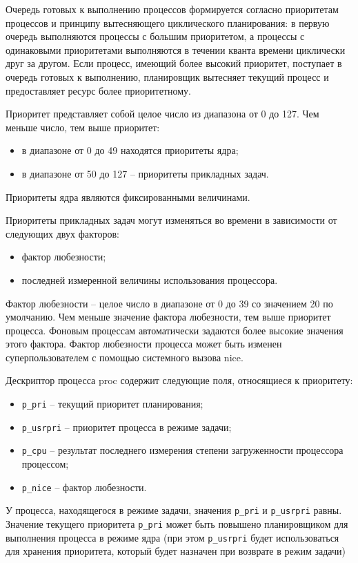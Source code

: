 Очередь готовых к выполнению процессов формируется согласно приоритетам процессов и принципу вытесняющего циклического планирования: в первую очередь выполняются процессы с большим приоритетом, а процессы с одинаковыми приоритетами выполняются в течении кванта времени циклически друг за другом. Если процесс, имеющий более высокий приоритет, поступает в очередь готовых к выполнению, планировщик вытесняет текущий процесс и предоставляет ресурс более приоритетному.

Приоритет представляет собой целое число из диапазона от 0 до 127. Чем меньше число, тем выше приоритет:
\begin{itemize}
    \item в диапазоне от 0 до 49 находятся приоритеты ядра;
    \item в диапазоне от 50 до 127 – приоритеты прикладных задач.
\end{itemize}

Приоритеты ядра являются фиксированными величинами.

Приоритеты прикладных задач могут изменяться во времени в зависимости от следующих двух факторов:
\begin{itemize}
    \item фактор любезности;
    \item последней измеренной величины использования процессора.
\end{itemize}

Фактор любезности – целое число в диапазоне от 0 до 39 со значением 20 по умолчанию. Чем меньше значение фактора любезности, тем выше приоритет процесса. Фоновым процессам автоматически задаются более высокие значения этого фактора. Фактор любезности процесса может быть изменен суперпользователем с помощью системного вызова nice.

Дескриптор процесса proc содержит следующие поля, относящиеся к приоритету:
\begin{itemize}
    \item \texttt{p\_pri} – текущий приоритет планирования;
    \item \texttt{p\_usrpri} – приоритет процесса в режиме задачи;
    \item \texttt{p\_cpu} – результат последнего измерения степени загруженности процессора процессом;
    \item \texttt{p\_nice} – фактор любезности.
\end{itemize}

У процесса, находящегося в режиме задачи, значения \texttt{p\_pri} и \texttt{p\_usrpri} равны. Значение текущего приоритета \texttt{p\_pri} может быть повышено планировщиком для выполнения процесса в режиме ядра (при этом \texttt{p\_usrpri} будет использоваться для хранения приоритета, который будет назначен при возврате в режим задачи)


